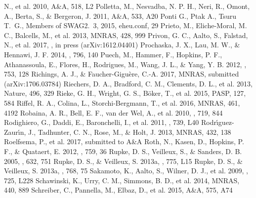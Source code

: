 \documentclass{pasa}%
\begin{document}
\begin{thebibliography}{}
    N., et al. 2010, A\&A, 518, L2
   Polletta, M., Nesvadba, N. P. H.,
    Neri, R., Omont, A., Berta, S., \& Bergeron, J. 2011, A\&A, 533, A20
   Ponti G., Ptak A., Tsuru T.~G., Members
    of SWAG2.~3, 2015, eheu.conf, 29 
  Prieto, M., Eliche-Moral, M. C.,
    Balcells, M., et al. 2013, MNRAS, 428, 999
   Privon, G. C., Aalto, S., Falstad, N.,
    et al. 2017, \apj, in press (arXiv:1612.04401)
   Prochaska, J. X., Lau, M. W., \&
    Hennawi, J. F. 2014, \apj, 796, 140
   Puech, M., Hammer, F., Hopkins, P. F.,
    Athanassoula, E., Flores, H., Rodrigues, M., Wang, J. L., \& Yang,
    Y. B. 2012, \apj, 753, 128
  Richings, A. J., \&
   Faucher-Gigu\`ere, C.-A. 2017, MNRAS, submitted (arXiv:1706.03784)
   Riechers, D. A., Bradford, C. M.,
    Clements, D. L., et al. 2013, Nature, 496, 329
   Rieke, G. H., Wright, G. S., B\"oker,
    T., et al. 2015, PASP, 127, 584 
   Riffel, R. A., Colina, L.,
    Storchi-Bergmann, T., et al. 2016, MNRAS, 461, 4192
    Robaina, A. R., Bell, E. F., van der
     Wel, A., et al. 2010, \apj, 719, 844 
    Rodighiero, G., Daddi, E.,
     Baronchelli, I., et al. 2011, \apj, 739, L40
     Rodr\'{\i}guez-Zaur\'{\i}n, J., Tadhunter, C. N., Rose, M., \& Holt,
     J. 2013, MNRAS, 432, 138 
    Roelfsema, P., et al. 2017, 
     submitted to A\&A
    Roth, N., Kasen, D., Hopkins, P. F., \&
    Quataert, E. 2012, \apj, 759, 36 
   Rupke, D. S., Veilleux, S., \&
    Sanders, D. B. 2005, \apj, 632, 751
   Rupke, D. S., \& Veilleux,
    S. 2013a, \apj, 775, L15
   Rupke, D. S., \& Veilleux,
    S. 2013a, \apj, 768, 75
   Sakamoto, K., Aalto, S., Wilner,
    D. J., et al. 2009, \apj, 725, L228
   Schawinski, K., Urry, C. M.,
    Simmons, B. D., et al. 2014, MNRAS, 440, 889
  Schreiber, C., Pannella, M., Elbaz,
    D., et al. 2015, A\&A, 575, A74

\end{thebibliography}
\end{document}

